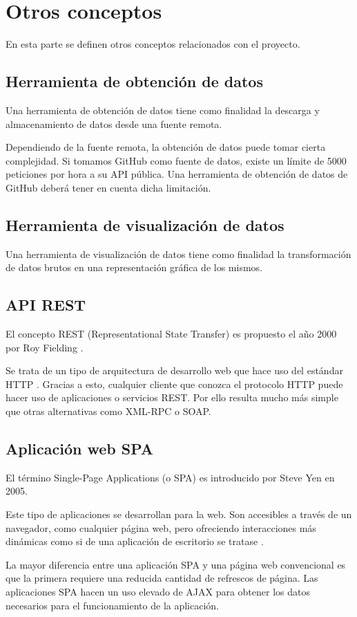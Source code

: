 \section{Otros conceptos}

En esta parte se definen otros conceptos relacionados con el proyecto.

\subsection{Herramienta de obtención de datos}

Una herramienta de obtención de datos tiene como finalidad la descarga y almacenamiento de datos desde una fuente remota.

Dependiendo de la fuente remota, la obtención de datos puede tomar cierta complejidad. Si tomamos GitHub como fuente de datos, existe un límite de 5000 peticiones por hora a su API pública. Una herramienta de obtención de datos de GitHub deberá tener en cuenta dicha limitación.

\subsection{Herramienta de visualización de datos}

Una herramienta de visualización de datos tiene como finalidad la transformación de datos brutos en una representación gráfica de los mismos.

\subsection{API REST}

El concepto REST (Representational State Transfer) es propuesto el año 2000 por Roy Fielding \cite{fielding2000architectural}.

Se trata de un tipo de arquitectura de desarrollo web que hace uso del estándar HTTP \cite{asiermarques:rest}. Gracias a esto, cualquier cliente que conozca el protocolo HTTP puede hacer uso de aplicaciones o servicios REST. Por ello resulta mucho más simple que otras alternativas como XML-RPC o SOAP.

\subsection{Aplicación web SPA}

El término Single-Page Applications (o SPA) es introducido por Steve Yen en 2005. 

Este tipo de aplicaciones se desarrollan para la web. Son accesibles a través de un navegador, como cualquier página web, pero ofreciendo interacciones más dinámicas como si de una aplicación de escritorio se tratase \cite{codeschool:spa}.

La mayor diferencia entre una aplicación SPA y una página web convencional es que la primera requiere una reducida cantidad de refrescos de página. Las aplicaciones SPA hacen un uso elevado de AJAX para obtener los datos necesarios para el funcionamiento de la aplicación. 